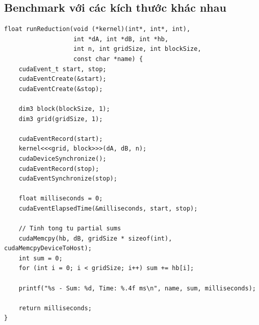 \subsection{Benchmark với các kích thước khác nhau}

\begin{lstlisting}[caption={Hàm benchmark reduction}, label={lst:benchmark_reduction}]
float runReduction(void (*kernel)(int*, int*, int), 
                   int *dA, int *dB, int *hb,
                   int n, int gridSize, int blockSize, 
                   const char *name) {
    cudaEvent_t start, stop;
    cudaEventCreate(&start);
    cudaEventCreate(&stop);
    
    dim3 block(blockSize, 1);
    dim3 grid(gridSize, 1);
    
    cudaEventRecord(start);
    kernel<<<grid, block>>>(dA, dB, n);
    cudaDeviceSynchronize();
    cudaEventRecord(stop);
    cudaEventSynchronize(stop);
    
    float milliseconds = 0;
    cudaEventElapsedTime(&milliseconds, start, stop);
    
    // Tinh tong tu partial sums
    cudaMemcpy(hb, dB, gridSize * sizeof(int), cudaMemcpyDeviceToHost);
    int sum = 0;
    for (int i = 0; i < gridSize; i++) sum += hb[i];
    
    printf("%s - Sum: %d, Time: %.4f ms\n", name, sum, milliseconds);
    
    return milliseconds;
}
\end{lstlisting}

\begin{table}[H]
\centering
\caption{So sánh hiệu năng 3 thuật toán Parallel Reduction}
\label{tab:reduction_comparison}
\end{table}

